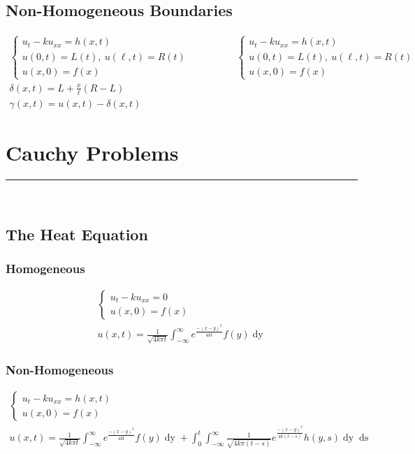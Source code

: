 \documentclass{article}
\begin{document}
\subsection{Non-Homogeneous Boundaries}
\begin{gather*}
\begin{cases}
u_{t} - ku_{xx} = h(x,t)\\
u(0,t) = L(t),\ u(\ell,t) = R(t)\\
u(x,0) = f(x)
\end{cases}
\hspace{2cm}
\begin{cases}
u_{t} - ku_{xx} = h(x,t)\\
u(0,t) = L(t),\ u(\ell,t) = R(t)\\
u(x,0) = f(x)
\end{cases}\\
\delta(x,t) = L + \frac{x}{\ell}(R - L)\\
\gamma(x,t) = u(x,t) - \delta(x,t)
\end{gather*}



\newpage
\section{Cauchy Problems}
\hrule
\noindent\\
\subsection{The Heat Equation}
\subsubsection*{Homogeneous}
\begin{gather*}
\begin{cases}
u_{t} - k u_{xx} = 0\\
u(x,0) = f(x)
\end{cases}\\
u(x,t) = \frac{1}{\sqrt{4k\pi t}}\int_{-\infty}^{\infty}e^{\frac{-(x-y)^{2}}{4kt}}f(y)\mathop{dy}
\end{gather*}
\subsubsection*{Non-Homogeneous}
\begin{gather*}
\begin{cases}
u_{t} - k u_{xx} = h(x,t)\\
u(x,0) = f(x)
\end{cases}\\
u(x,t) = \frac{1}{\sqrt{4k\pi t}}\int_{-\infty}^{\infty}e^{\frac{-(x-y)^{2}}{4kt}}f(y)\mathop{dy} + \int_{0}^{t}\int_{-\infty}^{\infty}\frac{1}{\sqrt{4k\pi(t-s)}}e^{\frac{-(x-y)^{2}}{4k(t -s)}}h(y,s)\mathop{dy}\mathop{ds}
\end{gather*}
\end{document}
